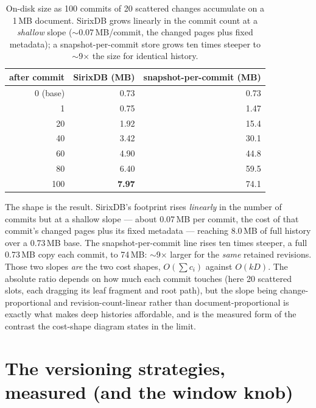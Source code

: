 \documentclass[11pt,a4paper,oneside]{report}
\theoremstyle{sirixthm}
\begin{document}
\begin{table}[h]
\centering\footnotesize\setlength{\tabcolsep}{8pt}\renewcommand{\arraystretch}{1.25}
\begin{tabular}{@{}r r r@{}}
\toprule
\textbf{after commit} & \textbf{SirixDB (MB)} & \textbf{snapshot-per-commit (MB)}\\
\midrule
0 (base) & 0.73 & 0.73\\
1        & 0.75 & 1.47\\
20       & 1.92 & 15.4\\
40       & 3.42 & 30.1\\
60       & 4.90 & 44.8\\
80       & 6.40 & 59.5\\
100      & \textbf{7.97} & 74.1\\
\bottomrule
\end{tabular}
\caption{On-disk size as 100 commits of 20 scattered changes accumulate on a 1\,MB document. SirixDB grows
linearly in the commit count at a \emph{shallow} slope ($\sim$0.07\,MB/commit, the changed pages plus fixed
metadata); a snapshot-per-commit store grows ten times steeper to $\sim$9$\times$ the size for identical
history.}
\label{tab:storagegrowth}
\end{table}

The shape is the result. SirixDB's footprint rises \emph{linearly} in the number of commits but at a
shallow slope --- about 0.07\,MB per commit, the cost of that commit's changed pages plus its fixed
metadata --- reaching 8.0\,MB of full history over a 0.73\,MB base. The snapshot-per-commit line rises ten
times steeper, a full 0.73\,MB copy each commit, to 74\,MB: $\sim$9$\times$ larger for the \emph{same}
retained revisions. Those two slopes \emph{are} the two cost shapes, $O(\sum c_i)$ against $O(kD)$. The
absolute ratio depends on how much each commit touches (here 20 scattered slots, each dragging its leaf
fragment and root path), but the slope being change-proportional and revision-count-linear rather than
document-proportional is exactly what makes deep histories affordable, and is the measured form of the
contrast the cost-shape diagram states in the limit.

\section{The versioning strategies, measured (and the window knob)}
\label{sec:versioningbench}
\end{document}
